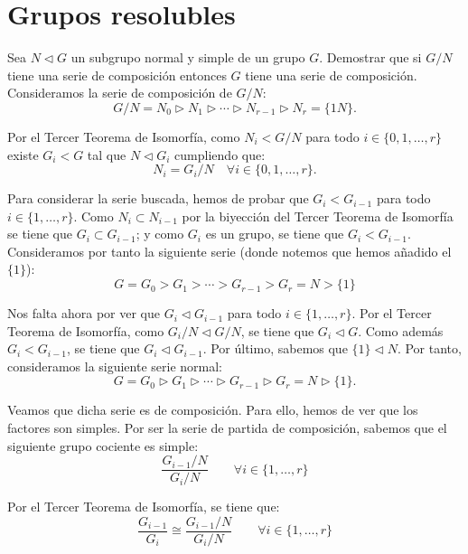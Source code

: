 \section{Grupos resolubles}

\begin{ejercicio}
    Sea $N\lhd G$ un subgrupo normal y simple de un grupo $G$. Demostrar que si $G/N$ tiene una serie de composición entonces $G$ tiene una serie de composición.\\
    
    Consideramos la serie de composición de $G/N$:
    \[
        G/N = N_0 \rhd N_1 \rhd \cdots \rhd N_{r-1} \rhd N_r = \{1N\}.
    \]

    Por el Tercer Teorema de Isomorfía, como $N_i<G/N$ para todo $i\in \{0,1,\ldots,r\}$ existe $G_i<G$ tal que $N\lhd G_i$ cumpliendo que:
    \begin{equation*}
        N_i = G_i/N \quad \forall i\in \{0,1,\ldots,r\}.
    \end{equation*}

    Para considerar la serie buscada, hemos de probar que $G_i < G_{i-1}$ para todo $i\in \{1,\ldots,r\}$. Como $N_i\subset N_{i-1}$ por la biyección del Tercer Teorema de Isomorfía se tiene que $G_i\subset G_{i-1}$; y como $G_i$ es un grupo, se tiene que $G_i<G_{i-1}$. Consideramos por tanto la siguiente serie (donde notemos que hemos añadido el $\{1\}$):
    \[
        G = G_0 > G_1 > \cdots > G_{r-1} > G_r = N > \{1\}
    \]

    Nos falta ahora por ver que $G_i \lhd G_{i-1}$ para todo $i\in \{1,\ldots,r\}$. Por el Tercer Teorema de Isomorfía, como $G_i/N \lhd G/N$, se tiene que $G_i \lhd G$. Como además $G_i<G_{i-1}$, se tiene que $G_i \lhd G_{i-1}$. Por último, sabemos que $\{1\} \lhd N$.    
    Por tanto, consideramos la siguiente serie normal:
    \[
        G = G_0 \rhd G_1 \rhd \cdots \rhd G_{r-1} \rhd G_r = N \rhd \{1\}.
    \]

    Veamos que dicha serie es de composición. Para ello, hemos de ver que los factores son simples. Por ser la serie de partida de composición, sabemos que el siguiente grupo cociente es simple:
    \begin{equation*}
        \dfrac{G_{i-1}/N}{G_i/N}\qquad \forall i\in \{1,\ldots,r\}
    \end{equation*}

    Por el Tercer Teorema de Isomorfía, se tiene que:
    \begin{equation*}
        \dfrac{G_{i-1}}{G_i} \cong \dfrac{G_{i-1}/N}{G_i/N}\qquad \forall i\in \{1,\ldots,r\}
    \end{equation*}


\end{ejercicio}
